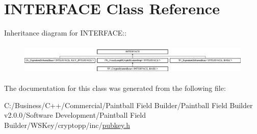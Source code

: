 \hypertarget{class_i_n_t_e_r_f_a_c_e}{
\section{INTERFACE Class Reference}
\label{class_i_n_t_e_r_f_a_c_e}
}
Inheritance diagram for INTERFACE::\begin{figure}[H]
\begin{center}
\leavevmode
\includegraphics[height=1.50134cm]{class_i_n_t_e_r_f_a_c_e}
\end{center}
\end{figure}


The documentation for this class was generated from the following file:\begin{DoxyCompactItemize}
\item 
C:/Business/C++/Commercial/Paintball Field Builder/Paintball Field Builder v2.0.0/Software Development/Paintball Field Builder/WSKey/cryptopp/inc/\hyperlink{pubkey_8h}{pubkey.h}\end{DoxyCompactItemize}

